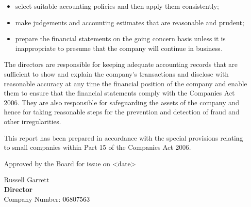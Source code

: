 \begin{itemize}
    \item select suitable accounting policies and then apply them consistently;
    \item make judgements and accounting estimates that are reasonable and prudent;
    \item prepare the financial statements on the going concern basis unless it is inappropriate to presume that the company will continue in business.
\end{itemize}

The directors are responsible for keeping adequate accounting records that are sufficient to show and explain the company's transactions and disclose with reasonable accuracy at any time the financial position of the company and enable them to ensure that the financial statements comply with the Companies Act 2006. They are also responsible for safeguarding the assets of the company and hence for taking reasonable steps for the prevention and detection of fraud and other irregularities.

This report has been prepared in accordance with the special provisions relating to small companies within Part 15 of the Companies Act 2006.

Approved by the Board for issue on <date>
\vspace{48pt}

Russell Garrett \\
{\bf Director} \\
Company Number: 06807563
